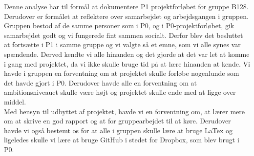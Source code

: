 Denne analyse har til formål at dokumentere P1 projektforløbet for gruppe B128. Derudover er formålet at reflektere over samarbejdet og arbejdsgangen i gruppen.
\\
Gruppen bestod af de samme personer som i P0, og i P0-projektforløbet, gik samarbejdet godt og vi fungerede fint sammen socialt. Derfor blev det besluttet at fortsætte i P1 i samme gruppe og vi valgte så et emne, som vi alle synes var spændende. Derved kendte vi alle hinanden og det gjorde at det var let at komme i gang med projektet, da vi ikke skulle bruge tid på at lære hinanden at kende. Vi havde i gruppen en forventning om at projektet skulle forløbe nogenlunde som det havde gjort i P0. Derudover havde alle en forventning om at ambitionsniveauet skulle være højt og projektet skulle ende med at ligge over middel. 
\\
Med hensyn til udbyttet af projektet, havde vi en forventning om, at lærer mere om at skrive en god rapport og at for gruppearbejdet til at køre. Derudover havde vi også bestemt os for at alle i gruppen skulle lære at bruge LaTex og ligeledes skulle vi lære at bruge GitHub i stedet for Dropbox, som blev brugt i P0.  

